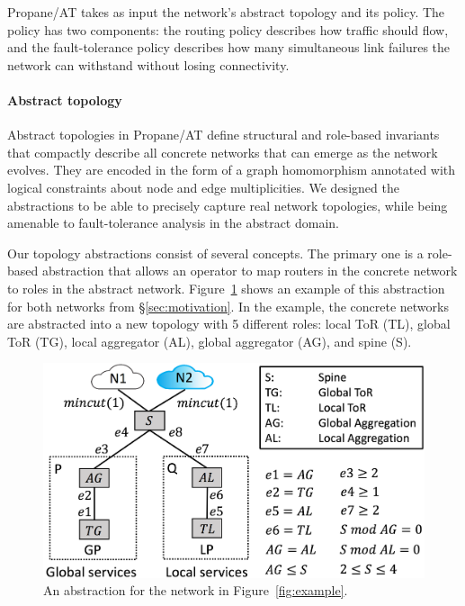 \documentclass[numbers, 10pt, preprint]{sigplanconf}
\newcommand{\sysname}{{\text{}\small \sf Propane/AT}\xspace}
\newcommand{\para}[1]{\paragraph*{\textbf{#1}}}
\begin{document}

\sysname takes as input the network's abstract topology and its policy. The policy has two components: the routing policy describes how traffic should flow, and the fault-tolerance policy describes how many simultaneous link failures the network can withstand without losing connectivity.

\para{Abstract topology}
Abstract topologies in \sysname define structural and role-based invariants that compactly describe all concrete networks that can emerge as the network evolves. They are encoded in the form of a graph homomorphism annotated with logical constraints about node and edge multiplicities.
%
We designed the abstractions to be able to precisely capture real network topologies, while being amenable to fault-tolerance analysis in the abstract domain.


Our topology abstractions consist of several concepts.
The primary one is a role-based abstraction that allows an operator to map routers in the concrete network to roles in the abstract network. Figure~\ref{fig:example3} shows an example of this abstraction for both networks from \S\ref{sec:motivation}. In the example, the concrete networks are abstracted into a new topology with 5 different roles: local ToR (TL), global ToR (TG), local aggregator (AL), global aggregator (AG), and spine (S).

\begin{figure}[t!]
  \centering
  \includegraphics[width=\columnwidth]{figures/example3}
  \vspace{-1.3em}
  \caption{An abstraction for the network in Figure~\ref{fig:example}.}
  \label{fig:example3}
  \vspace{-.6em}
\end{figure}
\end{document}
